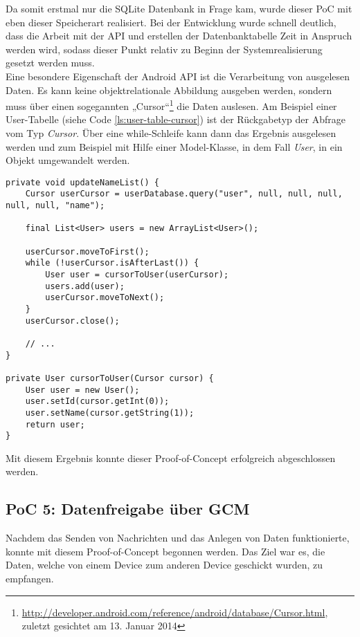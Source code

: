Da somit erstmal nur die SQLite Datenbank in Frage kam, wurde dieser PoC mit eben dieser Speicherart realisiert. Bei der Entwicklung wurde schnell deutlich, dass die Arbeit mit der API und erstellen der Datenbanktabelle Zeit in Anspruch werden wird, sodass dieser Punkt relativ zu Beginn der Systemrealisierung gesetzt werden muss.\\

Eine besondere Eigenschaft der Android API ist die Verarbeitung von ausgelesen Daten. Es kann keine objektrelationale Abbildung ausgeben werden, sondern muss über einen sogegannten „Cursor“\footnote{\url{http://developer.android.com/reference/android/database/Cursor.html}, zuletzt gesichtet am 13. Januar 2014} die Daten auslesen. Am Beispiel einer User-Tabelle (siehe Code \ref{ls:user-table-cursor}) ist der Rückgabetyp der Abfrage vom Typ \textit{Cursor}. Über eine while-Schleife kann dann das Ergebnis ausgelesen werden und zum Beispiel mit Hilfe einer Model-Klasse, in dem Fall \textit{User}, in ein Objekt umgewandelt werden.

\begin{lstlisting}[label=ls:user-table-cursor,caption=Auslesen aller Benutzer aus einer User-Tabelle]
private void updateNameList() {
	Cursor userCursor = userDatabase.query("user", null, null, null, null, null, "name");

	final List<User> users = new ArrayList<User>();

	userCursor.moveToFirst();
	while (!userCursor.isAfterLast()) {
		User user = cursorToUser(userCursor);
		users.add(user);
		userCursor.moveToNext();
	}
	userCursor.close();

	// ...
}

private User cursorToUser(Cursor cursor) {
	User user = new User();
	user.setId(cursor.getInt(0));
	user.setName(cursor.getString(1));
	return user;
}
\end{lstlisting}

Mit diesem Ergebnis konnte dieser Proof-of-Concept erfolgreich abgeschlossen werden.

\subsection{PoC 5: Datenfreigabe über GCM}

Nachdem das Senden von Nachrichten und das Anlegen von Daten funktionierte, konnte mit diesem Proof-of-Concept begonnen werden. Das Ziel war es, die Daten, welche von einem Device zum anderen Device geschickt wurden, zu empfangen.

